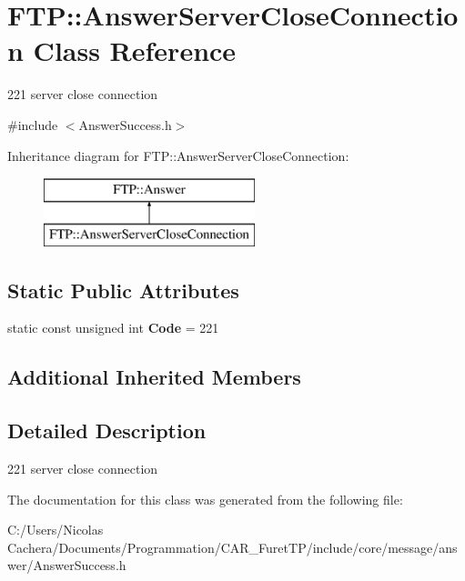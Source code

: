 \hypertarget{classFTP_1_1AnswerServerCloseConnection}{}\section{F\+T\+P\+:\+:Answer\+Server\+Close\+Connection Class Reference}
\label{classFTP_1_1AnswerServerCloseConnection}


221 server close connection  




{\ttfamily \#include $<$Answer\+Success.\+h$>$}

Inheritance diagram for F\+T\+P\+:\+:Answer\+Server\+Close\+Connection\+:\begin{figure}[H]
\begin{center}
\leavevmode
\includegraphics[height=2.000000cm]{classFTP_1_1AnswerServerCloseConnection}
\end{center}
\end{figure}
\subsection*{Static Public Attributes}
\begin{DoxyCompactItemize}
\item 
\hypertarget{classFTP_1_1AnswerServerCloseConnection_a84a59678802f8cb1a193b407e05b6814}{}static const unsigned int {\bfseries Code} = 221\label{classFTP_1_1AnswerServerCloseConnection_a84a59678802f8cb1a193b407e05b6814}

\end{DoxyCompactItemize}
\subsection*{Additional Inherited Members}


\subsection{Detailed Description}
221 server close connection 

The documentation for this class was generated from the following file\+:\begin{DoxyCompactItemize}
\item 
C\+:/\+Users/\+Nicolas Cachera/\+Documents/\+Programmation/\+C\+A\+R\+\_\+\+Furet\+T\+P/include/core/message/answer/Answer\+Success.\+h\end{DoxyCompactItemize}
